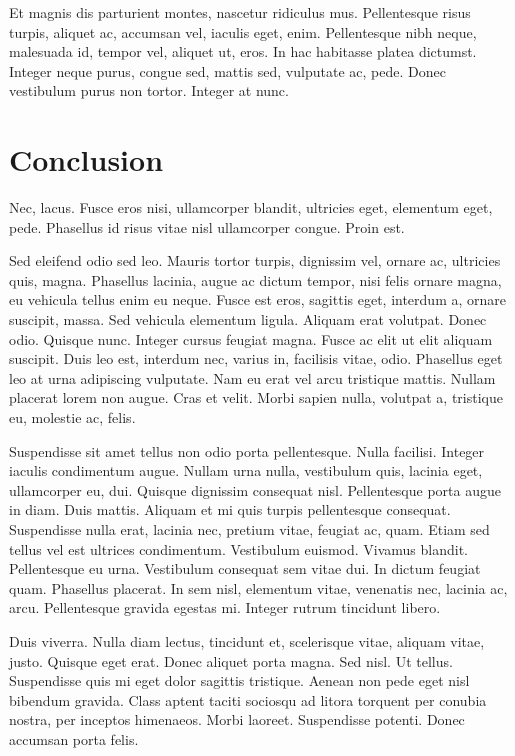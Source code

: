 \begin{encadre}
Et magnis dis parturient montes, nascetur ridiculus mus. Pellentesque risus
turpis, aliquet ac, accumsan vel, iaculis eget, enim. Pellentesque nibh neque,
malesuada id, tempor vel, aliquet ut, eros. In hac habitasse platea dictumst.
Integer neque purus, congue sed, mattis sed, vulputate ac, pede. Donec
vestibulum purus non tortor. Integer at nunc.
\end{encadre}

\section{Conclusion}
\label{chap:users:conclu}

Nec, lacus. Fusce eros nisi, ullamcorper blandit, ultricies eget, elementum
eget, pede. Phasellus id risus vitae nisl ullamcorper congue. Proin est.

Sed eleifend odio sed leo. Mauris tortor turpis, dignissim vel, ornare ac,
ultricies quis, magna. Phasellus lacinia, augue ac dictum tempor, nisi felis
ornare magna, eu vehicula tellus enim eu neque. Fusce est eros, sagittis eget,
interdum a, ornare suscipit, massa. Sed vehicula elementum ligula. Aliquam erat
volutpat. Donec odio. Quisque nunc. Integer cursus feugiat magna. Fusce ac elit
ut elit aliquam suscipit. Duis leo est, interdum nec, varius in, facilisis
vitae, odio. Phasellus eget leo at urna adipiscing vulputate. Nam eu erat vel
arcu tristique mattis. Nullam placerat lorem non augue. Cras et velit. Morbi
sapien nulla, volutpat a, tristique eu, molestie ac, felis.

Suspendisse sit amet tellus non odio porta pellentesque. Nulla facilisi. Integer
iaculis condimentum augue. Nullam urna nulla, vestibulum quis, lacinia eget,
ullamcorper eu, dui. Quisque dignissim consequat nisl. Pellentesque porta augue
in diam. Duis mattis. Aliquam et mi quis turpis pellentesque consequat.
Suspendisse nulla erat, lacinia nec, pretium vitae, feugiat ac, quam. Etiam sed
tellus vel est ultrices condimentum. Vestibulum euismod. Vivamus blandit.
Pellentesque eu urna. Vestibulum consequat sem vitae dui. In dictum feugiat
quam. Phasellus placerat. In sem nisl, elementum vitae, venenatis nec, lacinia
ac, arcu. Pellentesque gravida egestas mi. Integer rutrum tincidunt libero.

Duis viverra. Nulla diam lectus, tincidunt et, scelerisque vitae, aliquam vitae,
justo. Quisque eget erat. Donec aliquet porta magna. Sed nisl. Ut tellus.
Suspendisse quis mi eget dolor sagittis tristique. Aenean non pede eget nisl
bibendum gravida. Class aptent taciti sociosqu ad litora torquent per conubia
nostra, per inceptos himenaeos. Morbi laoreet. Suspendisse potenti. Donec
accumsan porta felis.

